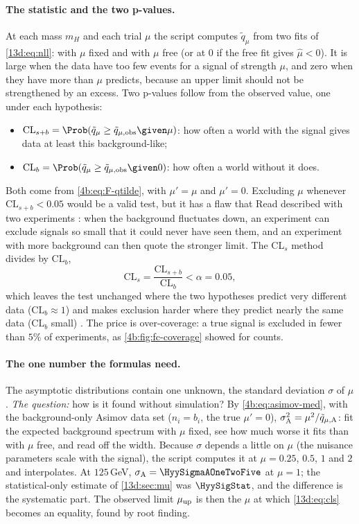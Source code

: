 \paragraph{The statistic and the two p-values.}
At each mass $m_H$ and each trial $\mu$ the script computes $\tilde q_\mu$ from two fits of
\eqref{13d:eq:nll}: with $\mu$ fixed and with $\mu$ free (or at $0$ if the free fit gives
$\hat\mu<0$). It is large when the data have too few events for a signal of strength
$\mu$, and zero when they have more than $\mu$ predicts, because an upper limit should not
be strengthened by an excess. Two p-values follow from the observed value, one under each
hypothesis:
\begin{itemize}[itemsep=1pt,leftmargin=1.2em]
  \item $\mathrm{CL}_{s+b}=\Prob(\tilde q_\mu\ge\tilde q_{\mu,\rm obs}\given\mu)$: how often
        a world with the signal gives data at least this background-like;
  \item $\mathrm{CL}_b=\Prob(\tilde q_\mu\ge\tilde q_{\mu,\rm obs}\given0)$: how often a
        world without it does.
\end{itemize}
Both come from \eqref{4b:eq:F-qtilde}, with $\mu'=\mu$ and $\mu'=0$. Excluding $\mu$
whenever $\mathrm{CL}_{s+b}<0.05$ would be a valid test, but it has a flaw that Read
described with two experiments \cite{Read2002}: when the background fluctuates down, an
experiment can exclude signals so small that it could never have seen them, and an
experiment with more background can then quote the stronger limit. The CL$_s$ method
divides by $\mathrm{CL}_b$,
\begin{equation}
  \mathrm{CL}_s=\frac{\mathrm{CL}_{s+b}}{\mathrm{CL}_b}<\alpha=0.05 ,
  \label{13d:eq:cls}
\end{equation}
which leaves the test unchanged where the two hypotheses predict very different data
($\mathrm{CL}_b\approx1$) and makes exclusion harder where they predict nearly the same
data ($\mathrm{CL}_b$ small) \cite{Junk1999,Read2002}. The price is over-coverage: a
true signal is excluded in fewer than $5\%$ of experiments, as \cref{4b:fig:fc-coverage}
showed for counts.

\paragraph{The one number the formulas need.}
The asymptotic distributions contain one unknown, the standard deviation $\sigma$ of
$\hat\mu$. \emph{The question:} how is it found without simulation? By
\eqref{4b:eq:asimov-med}, with the background-only Asimov data set ($n_i=b_i$, the true
$\mu'=0$), $\sigma_{\rm A}^2=\mu^2/\tilde q_{\mu,\rm A}$: fit the expected background
spectrum with $\mu$ fixed, see how much worse it fits than with $\mu$ free, and read off
the width. Because $\sigma$ depends a little on $\mu$ (the nuisance parameters scale
with the signal), the script computes it at $\mu=0.25$, $0.5$, $1$ and $2$ and
interpolates. At $125\,$GeV, $\sigma_{\rm A}=\HyySigmaAOneTwoFive$ at $\mu=1$; the
statistical-only estimate of \cref{13d:sec:mu} was $\HyySigStat$, and the difference is
the systematic part. The observed limit $\mu_{\rm up}$ is then the $\mu$ at which
\eqref{13d:eq:cls} becomes an equality, found by root finding.

